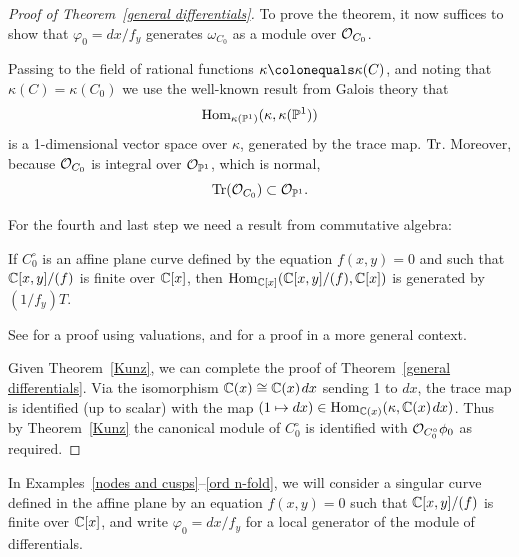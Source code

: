 \begin{proof}[Proof of Theorem~\ref{general differentials}]
 To prove the theorem, it now suffices to
show that
$\varphi_{0}=dx/f_{y}$ generates $\omega_{C_{0}}$ as a module over ${\mathcal O}_{C_{0}}$.

Passing to the field of rational functions $\kappa \colonequals
\kappa(C)$, and noting that
%
$\kappa(C) = \kappa(C_{0}) $ we use the well-known result from 
Galois theory
%
that
$$
\operatorname{Hom}_{\kappa(\mathbb P^{1})}(\kappa, \kappa(\mathbb P^{1}))
$$
is a 1-dimensional vector space over $\kappa$, generated by the trace map.
%
$\operatorname{Tr}$. Moreover,
because ${\mathcal O}_{C_{0}}$ is integral over ${\mathcal O}_{\mathbb P^{1}}$, which is normal,
$$
\operatorname{Tr}({\mathcal O}_{C_{0}})\subset {\mathcal O}_{\mathbb P^{1}}.
$$

For the fourth and last step we need a
result from commutative
algebra:

\begin{theorem}\label{Kunz}
If $C_{0}^{\circ}$ is an affine plane curve defined by the
equation $f(x,y)=0$ and such that ${\mathbb C}[x,y]/(f)$ is finite over ${\mathbb C}[x]$,
then $\operatorname{Hom}_{{\mathbb C}[x]}({\mathbb C}[x,y]/(f), {\mathbb C}[x])$ is generated by $(1/f_{y})T$.
\unif
\end{theorem}

See \cite[Theorem 15.1]{Kunz} for a proof using valuations, and
\cite[Theorem A.1]{MR4026452} for a proof in
a more general context.

Given Theorem~\ref{Kunz}, we can complete the proof of
Theorem~\ref{general differentials}. Via the isomorphism ${\mathbb C}(x) \cong
{\mathbb C}(x)\kern1ptdx$ sending 1 to $dx$, the trace map is identified (up to scalar)
with the map $(1\mapsto dx) \in \operatorname{Hom}_{{\mathbb C}(x)}(\kappa, {\mathbb C}(x)\kern1ptdx)$. Thus
by Theorem~\ref{Kunz}
the canonical module of $C_{0}^{\circ}$ is identified with
${\mathcal O}_{C_{0}^\circ} \phi_{0}$ as
required.
\end{proof}

In Examples~\ref{nodes and cusps}--\ref{ord n-fold}, we will consider a singular 
 curve defined in the affine plane by an equation $f(x,y) = 0$
 such that ${\mathbb C}[x,y]/(f)$ is finite over ${\mathbb C}[x]$, and write $\varphi_{0} = dx/f_{y}$
 for a local generator of the module of differentials.
 
